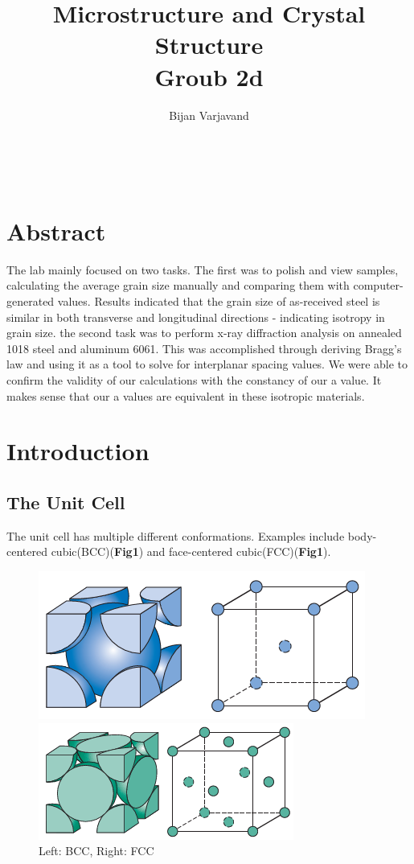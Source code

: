 \documentclass{article}
\author{Bijan Varjavand}
\title{Microstructure and Crystal Structure\\Groub 2d}
\begin{document}
\maketitle
\ \\[2in]

\section{Abstract}
\centering
The lab mainly focused on two tasks. The first was to polish and view samples, calculating the average grain size manually and comparing them with computer-generated values. Results indicated that the grain size of as-received steel is similar in both transverse and longitudinal directions - indicating isotropy in grain size. the second task was to perform x-ray diffraction analysis on annealed 1018 steel and aluminum 6061. This was accomplished through deriving Bragg's law and using it as a tool to solve for interplanar spacing values. We were able to confirm the validity of our calculations with the constancy of our a value. It makes sense that our a values are equivalent in these isotropic materials.

\clearpage

\raggedright
\section{Introduction}

\subsection{The Unit Cell}

The unit cell has multiple different conformations. Examples include body-centered cubic(BCC)(\textbf{Fig1}) and face-centered cubic(FCC)(\textbf{Fig1}).

\begin{figure}[h]
	\begin{minipage}{0.5\textwidth}
		\centering
		\includegraphics[scale=.5]{bcc.png}
	\end{minipage}
	\begin{minipage}{0.5\textwidth}
		\centering
		\includegraphics[scale=.6]{fcc.png}
	\end{minipage}
	\caption{Left: BCC, Right: FCC}
\end{figure}
\end{document}
